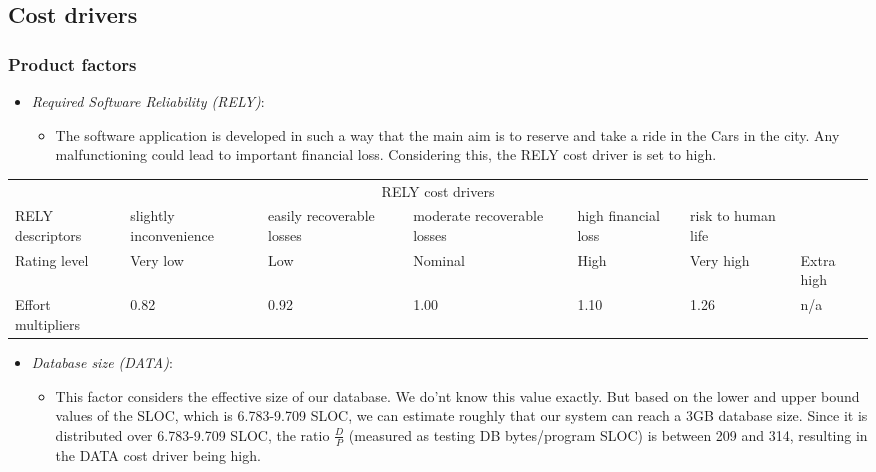 \subsection{Cost drivers}

\subsubsection{Product factors}

\begin{itemize}
	\item \emph{Required Software Reliability (RELY)}:
	\begin{itemize}
			\item[] The software application is developed in such a way that the main aim is to reserve and take a ride in the Cars in the city. Any malfunctioning could lead to important financial loss. Considering this, the RELY cost driver is set to high.
	\end{itemize}
\end{itemize}

\begin{table}[H]
	\hspace*{-1.7cm}
	\begin{tabular}{|p{2cm}|p{2cm}|p{2cm}|p{2cm}|p{2cm}|p{2cm}|p{2cm}|}
		\hline
		\multicolumn{7}{|c|}{RELY cost drivers} \\
		\hhline{|=======|}
		RELY descriptors & slightly inconvenience & easily recoverable losses & moderate recoverable losses & high financial loss & risk to human life & \\
		\hline
		Rating level & Very low & Low & Nominal & High & Very high & Extra high \\
		\hline
		Effort multipliers & 0.82 & 0.92 & 1.00 & 1.10 & 1.26 & n/a \\
		\hline
	\end{tabular}
\end{table}

\begin{itemize}
	\item \emph{Database size (DATA)}:
	\begin{itemize}
		 \item[] This factor considers the effective size of our database. We do'nt know this value exactly. But based on the lower and upper bound values of the SLOC, which is 6.783-9.709 SLOC, we can estimate roughly that our system can reach a 3GB database size. Since it is distributed over 6.783-9.709 SLOC, the ratio \(\frac{D}{P}\) (measured as testing DB bytes/program SLOC) is between 209 and 314, resulting in the DATA cost driver being high.
	\end{itemize}
\end{itemize}

